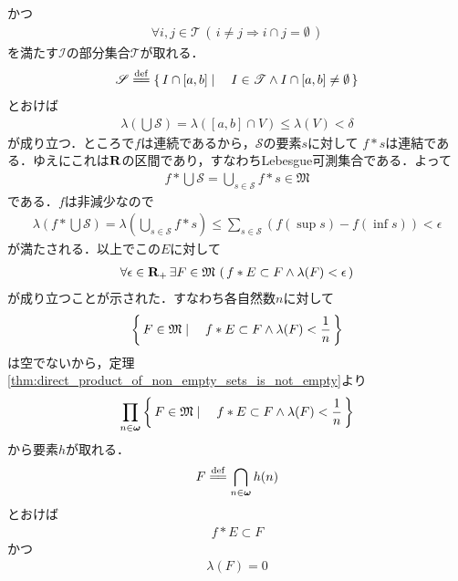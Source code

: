 \begin{sketch}
		かつ
		\begin{align}
			\forall i,j \in \mathscr{T}\, (\, i \neq j \Longrightarrow i \cap j = \emptyset\, )
		\end{align}
		を満たす$\mathscr{I}$の部分集合$\mathscr{T}$が取れる．
		\begin{align}
			\mathscr{S} \defeq \Set{I \cap [a,b]}{I \in \mathscr{T} \wedge I \cap [a,b] \neq \emptyset}
		\end{align}
		とおけば
		\begin{align}
			\lambda\left(\bigcup \mathscr{S}\right)
			= \lambda\left([a,b] \cap V\right) \leq \lambda(V) < \delta
		\end{align}
		が成り立つ．ところで$f$は連続であるから，$\mathscr{S}$の要素$s$に対して
		$f \ast s$は連結である．ゆえにこれは$\mathbf{R}$の区間であり，すなわちLebesgue可測集合である．よって
		\begin{align}
			f \ast \bigcup \mathscr{S} = \bigcup_{s \in \mathscr{S}} f \ast s \in \mathfrak{M}
		\end{align}
		である．$f$は非減少なので
		\begin{align}
			\lambda\left(f \ast \bigcup \mathscr{S}\right)
			= \lambda\left(\bigcup_{s \in \mathscr{S}} f \ast s\right)
			\leq \sum_{s \in \mathscr{S}} \left(f(\sup{}{s}) - f(\inf{}{s})\right)
			< \epsilon
		\end{align}
		が満たされる．以上でこの$E$に対して
		\begin{align}
			\forall \epsilon \in \mathbf{R}_+\, \exists F \in \mathfrak{M}\,
			\left(\, f \ast E \subset F \wedge \lambda(F) < \epsilon\, \right)
		\end{align}
		が成り立つことが示された．すなわち各自然数$n$に対して
		\begin{align}
			\left\{\, F \in \mathfrak{M} \mid \quad f \ast E \subset F \wedge \lambda(F) < \frac{1}{n}\, \right\}
		\end{align}
		は空でないから，定理\ref{thm:direct_product_of_non_empty_sets_is_not_empty}より
		\begin{align}
			\prod_{n \in {\boldsymbol \omega}} \left\{\, F \in \mathfrak{M} \mid \quad f \ast E \subset F \wedge \lambda(F) < \frac{1}{n}\, \right\}
		\end{align}
		から要素$h$が取れる．
		\begin{align}
			F \defeq \bigcap_{n \in \Natural} h(n)
		\end{align}
		とおけば
		\begin{align}
			f \ast E \subset F
		\end{align}
		かつ
		\begin{align}
			\lambda(F) = 0

\end{align}
\end{sketch}
